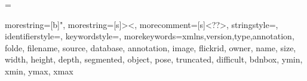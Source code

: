 
\RequirePackage[labelsep=space,tableposition=top]{caption}
\renewcommand{\figurename}{\bfseries Gambar } %
\renewcommand{\tablename}{\bfseries Tabel }





\usepackage{subcaption}

\usepackage{booktabs} %
\usepackage{multirow}



\usepackage{siunitx} %

\emergencystretch=\maxdimen
{}

\usepackage{listings}

\usepackage{color}


{
  morestring=[b]",
  morestring=[s]{>}{<},
  morecomment=[s]{<?}{?>},
  stringstyle=\color{black},
  identifierstyle=\color{darkblue},
  keywordstyle=\color{cyan},
  morekeywords={xmlns,version,type,annotation, folde, filename, source, database, annotation, image, flickrid, owner, name, size, width, height, depth, segmented, object, pose, truncated, difficult, bdnbox, ymin, xmin, ymax, xmax}%
}

